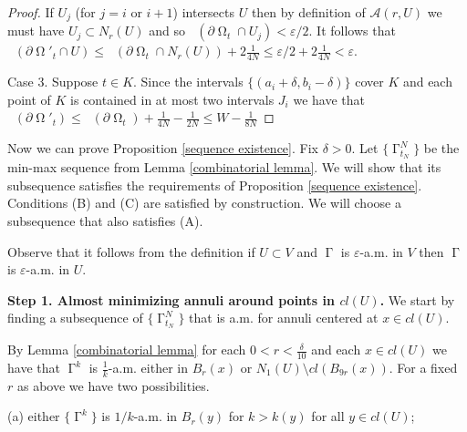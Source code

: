 \documentclass[12pt]{amsart}
\DeclareMathOperator{\Hn}{\mathcal{H}^n}
\DeclareMathOperator{\G}{\Gamma}
\DeclareMathOperator{\Om}{\Omega}
\theoremstyle{definition}
\begin{document}
\begin{proof}
If $U_j$ (for $j=i$ or $i+1$) 
intersects $U$
then by definition of $\mathcal{A}(r,U)$ we must have 
$U_j \subset N_r(U)$ and so $\Hn(\partial \Om_t \cap U_j) < \varepsilon/2$.
It follows that 
$\Hn(\partial \Om'_t \cap U) \leq \Hn(\partial \Om_t \cap N_r(U)) + 2 \frac{1}{4N}
\leq  \varepsilon/2 + 2 \frac{1}{4N} < \varepsilon$.


Case 3. Suppose $t \in K$. Since the intervals $\{(a_i+ \delta,b_i-\delta)\}$
cover $K$ and each point of $K$ is contained in at most two intervals $J_i$ we have
that $\Hn(\partial \Om'_t) \leq \Hn(\partial \Om_t)+ \frac{1}{4N} - \frac{1}{2N} \leq W - \frac{1}{8N}$


\end{proof}

Now we can prove Proposition \ref*{sequence existence}. Fix $\delta>0$.
Let $\{ \G^N_{t_N} \}$ be the min-max sequence from Lemma \ref*{combinatorial lemma}. 
We will show that its subsequence satisfies the requirements of 
Proposition \ref*{sequence existence}.
Conditions (B) and (C) are satisfied by construction. 
We will choose a subsequence that also satisfies (A).


Observe that it follows from the definition
if $U \subset V$ and $\G$ is $\varepsilon$-a.m. in $V$
then $\G$ is $\varepsilon$-a.m. in $U$.

\textbf{Step 1. Almost minimizing annuli around points in $cl(U)$.}
We start by finding a subsequence of $\{ \G^N_{t_N} \}$ that is a.m. 
for annuli centered at $x \in cl(U)$.

By Lemma \ref*{combinatorial lemma} for each $0<r<\frac{\delta}{10}$ and each $x \in cl(U)$ we have that
$\G^k$ is $\frac{1}{k}$-a.m. either in $B_r(x)$ or $N_{1}(U) \setminus cl(B_{9r}(x))$.
For a fixed $r$ as above we have two possibilities.

(a) either $\{ \G^k \}$ is $1/k$-a.m. in $B_r(y)$ for $k>k(y)$ for all $y \in cl(U)$;
\end{document}

